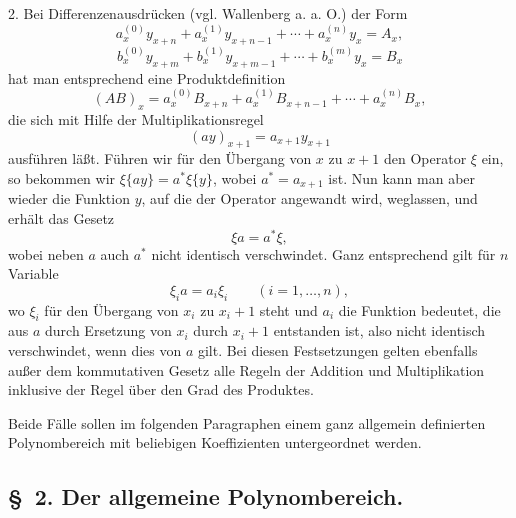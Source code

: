 \documentclass[11pt]{article}
\begin{document}
2. Bei Differenzenausdrücken (vgl. Wallenberg a. a. O.) der Form
\[
 a_x^{(0)}y_{x+n}+a_x^{(1)}y_{x+n-1}+\cdots+a_x^{(n)}y_x=A_x,
\]
\[
 b_x^{(0)}y_{x+m}+b_x^{(1)}y_{x+m-1}+\cdots+b_x^{(m)}y_x=B_x
\]
hat man entsprechend eine Produktdefinition
\[
 (AB)_x=a_x^{(0)}B_{x+n}+a_x^{(1)}B_{x+n-1}+\cdots+a_x^{(n)}B_x,
\]
die sich mit Hilfe der Multiplikationsregel
\[
 (ay)_{x+1}=a_{x+1}y_{x+1}
\]
ausführen läßt. Führen wir für den Übergang von $x$ zu $x+1$ den Operator $\xi$ ein, so bekommen wir $\xi\{ay\}=a^*\xi\{y\}$, wobei $a^*=a_{x+1}$ ist. Nun kann man aber wieder die Funktion $y$, auf die der Operator angewandt wird, weglassen, und erhält das Gesetz
\begin{equation}
 \xi a=a^*\xi,
\tag{3}
\end{equation}
wobei neben $a$ auch $a^*$ nicht identisch verschwindet. Ganz entsprechend gilt für $n$ Variable
\begin{equation}
 \xi_i a=a_i\xi_i\qquad (i=1,\ldots,n),
\tag{4}
\end{equation}
wo $\xi_i$ für den Übergang von $x_i$ zu $x_i+1$ steht und $a_i$ die Funktion bedeutet, die aus $a$ durch Ersetzung von $x_i$ durch $x_i+1$ entstanden ist, also nicht identisch verschwindet, wenn dies von $a$ gilt. Bei diesen Festsetzungen gelten ebenfalls außer dem kommutativen Gesetz alle Regeln der Addition und Multiplikation inklusive der Regel über den Grad des Produktes.

Beide Fälle sollen im folgenden Paragraphen einem ganz allgemein definierten Polynombereich mit beliebigen Koeffizienten untergeordnet werden.

\subsection*{\S~2. Der allgemeine Polynombereich.}
\end{document}

